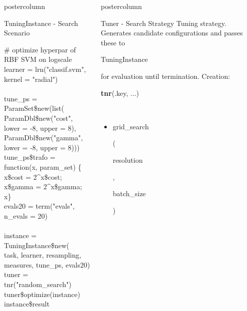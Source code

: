 \documentclass{beamer}
\newlength{\columnheight} %
\newcommand{\codeinline}[1]{\begin{codeboxinline}#1\end{codeboxinline}}
\begin{document}
\begin{frame}[fragile]{}
\begin{columns}
\begin{column}{.245\textwidth}
\begin{beamercolorbox}[center]{postercolumn}
\begin{minipage}{.98\textwidth}
{\begin{myblock}{TuningInstance - Search Scenario}
\begin{codeboxexample}
								{\scriptsize
									\# optimize hyperpar of RBF SVM on logscale\\
									learner = lrn("classif.svm", kernel = "radial")\\
									\\
									tune\_ps = ParamSet\$new(list(\\
									\hspace*{1ex} ParamDbl\$new("cost", lower = -8, upper = 8),\\
									\hspace*{1ex} ParamDbl\$new("gamma", lower = -8, upper = 8)))\\
									tune\_ps\$trafo = function(x, param\_set) \{\\
									\hspace*{1ex} x\$cost = 2\textasciicircum x\$cost; x\$gamma = 2\textasciicircum x\$gamma; x\}\\
									evals20 = term("evals", n\_evals = 20)\\
									\\
									instance = TuningInstance\$new(\\
									\hspace*{1ex} task, learner, resampling, measures, tune\_ps, evals20)\\
									tuner = tnr("random\_search")\\
									tuner\$optimize(instance)\\
									instance\$result}
							\end{codeboxexample}
						\end{myblock}
						\vfill}
				\end{minipage}
			\end{beamercolorbox}
		\end{column}
		\begin{column}{.245\textwidth}
			\begin{beamercolorbox}[center]{postercolumn}
				\begin{minipage}{.98\textwidth}
					\parbox[t][\columnheight]{\textwidth}{
						\begin{myblock}{Tuner - Search Strategy}
							Tuning strategy. 
							Generates candidate configurations and passes these to \codeinline{TuningInstance} for evaluation until termination.
							Creation: \codeinline{\textbf{tnr}(.key, ...)}
							\\
							\begin{itemize}
								\item \codeinline{grid\_search}
								      (\codeinline{resolution}, \codeinline{batch\_size})\\

\end{itemize}
\end{myblock}}
\end{minipage}
\end{beamercolorbox}
\end{column}
\end{columns}
\end{frame}
\end{document}

